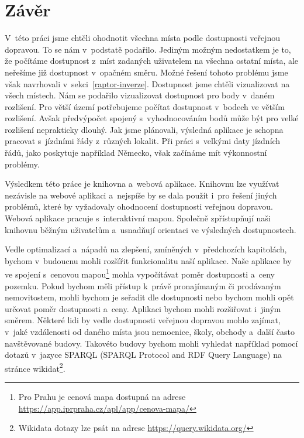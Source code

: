 \chapter*{Závěr}

V~této práci jsme chtěli ohodnotit všechna místa podle dostupnosti veřejnou dopravou. To se nám v~podstatě podařilo. Jediným možným nedostatkem je to, že počítáme dostupnost z~míst zadaných uživatelem na všechna ostatní místa, ale neřešíme již dostupnost v~opačném směru. Možné řešení tohoto problému jsme však navrhovali v~sekci~\ref{raptor-inverze}.
Dostupnost jsme chtěli vizualizovat na všech místech. Nám se podařilo vizualizovat dostupnost pro body v~daném rozlišení. Pro větší území potřebujeme počítat dostupnost v~bodech ve větším rozlišení. Avšak předvýpočet spojený s~vyhodnocováním bodů může být pro velké rozlišení neprakticky dlouhý.
Jak jsme plánovali, výsledná aplikace je schopna pracovat s~jízdními řády z~různých lokalit. Při práci s~velkými daty jízdních řádů, jako poskytuje například Německo, však začínáme mít výkonnostní problémy. %


Výsledkem této práce je knihovna a~webová aplikace. Knihovnu lze využívat nezávisle na webové aplikaci a~nejspíše by se dala použít i~pro řešení jiných problémů, které by vyžadovaly ohodnocení dostupnosti veřejnou dopravou. Webová aplikace pracuje s~interaktivní mapou. Společně zpřístupňují naši knihovnu běžným uživatelům a~usnadňují orientaci ve výsledných dostupnostech. 


Vedle optimalizací a~nápadů na zlepšení, zmíněných v~předchozích kapitolách, bychom v~budoucnu mohli rozšířit funkcionalitu naší aplikace.
Naše aplikace by ve spojení s~cenovou mapou\footnote{Pro Prahu je cenová mapa dostupná na adrese \url{https://app.iprpraha.cz/apl/app/cenova-mapa/}} mohla vypočítávat poměr dostupnosti a~ceny pozemku.
Pokud bychom měli přístup k~právě pronajímaným či prodávaným nemovitostem, mohli bychom je seřadit dle dostupnosti nebo bychom mohli opět určovat poměr dostupnosti a~ceny.
Aplikaci bychom mohli rozšiřovat i~jiným směrem.
Některé lidi by vedle dostupnosti veřejnou dopravou mohlo zajímat, v~jaké vzdálenosti od daného místa jsou nemocnice, školy, obchody a~další často navštěvované budovy. Takovéto budovy bychom mohli vyhledat například pomocí dotazů v~jazyce SPARQL (SPARQL Protocol and RDF Query Language) na stránce wikidat\footnote{Wikidata dotazy lze psát na adrese \url{https://query.wikidata.org/}}.
